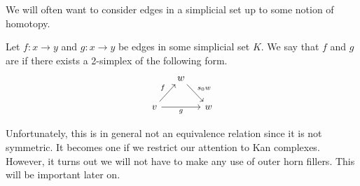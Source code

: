 \documentclass[main.tex]{subfiles}
\begin{document}
We will often want to consider edges in a simplicial set up to some notion of homotopy.

\begin{definition}
  \label{def:homotopy_of_edges}
  Let $f\colon x \to y$ and $g\colon x \to y$ be edges in some simplicial set $K$. We say that $f$ and $g$ are  if there exists a 2-simplex of the following form.
  \begin{equation*}
    \begin{tikzcd}[column sep=small]
      & w
      \arrow[dr, "s_{0}w"]
      \\
      v
      \arrow[ur, "f"]
      \arrow[rr, swap, "g"]
      && w
    \end{tikzcd}
  \end{equation*}
\end{definition}

Unfortunately, this is in general not an equivalence relation since it is not symmetric. It becomes one if we restrict our attention to Kan complexes. However, it turns out we will not have to make any use of outer horn fillers. This will be important later on.
\end{document}
